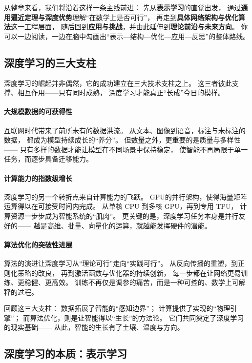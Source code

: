 从整章来看，我们将沿着这样一条主线前进：  
先从\textbf{表示学习}的直觉出发，  
通过\textbf{通用逼近定理与深度优势}理解“在数学上是否可行”，  
再走到\textbf{具体网络架构与优化算法}这一工程层面，  
随后回到\textbf{应用与挑战}，并由此延伸到\textbf{理论前沿与未来方向}。  
你可以一边阅读，一边在脑中勾画出“表示—结构—优化—应用—反思”的整体路线。

\subsection{深度学习的三大支柱}

深度学习的崛起并非偶然，它的成功建立在三大技术支柱之上。  
这三者彼此支撑、相互作用——只有同时成熟，  
深度学习才能真正“长成”今日的模样。

\paragraph{大规模数据的可获得性}  
互联网时代带来了前所未有的数据洪流。  
从文本、图像到语音，标注与未标注的数据，  
都成为模型持续成长的“养分”。  
但数量之外，更重要的是质量与多样性——  
只有多样的数据才能让模型在不同场景中保持稳定，  
使智能不再局限于单一任务，而逐步具备迁移能力。  

\paragraph{计算能力的指数级增长}  
深度学习的另一个转折点来自计算能力的飞跃。  
GPU的并行架构，使得海量矩阵运算得以在可接受时间内完成。  
从单核 CPU 到多核 GPU，再到专用 TPU，  
计算资源一步步成为智能系统的“肌肉”。  
更关键的是，深度学习任务本身是并行友好的——  
越是高维、批量、向量化的运算，就越能发挥硬件的潜能。  

\paragraph{算法优化的突破性进展}  
算法的演进让深度学习从“理论可行”走向“实践可行”。  
从反向传播的重塑，到正则化策略的改良，  
再到激活函数与优化器的持续创新，  
每一步都在让网络更易训练、更稳健、更高效。  
训练不再仅是调参的痛苦，而是一种可控的、数学上可解释的过程。  

回顾这三大支柱：  
数据拓展了智能的“感知边界”；  
计算提供了实现的“物理引擎”；  
而算法优化，则是让智能得以“生长”的方法论。  
它们共同奠定了深度学习的现实基础——  
从此，智能的生长有了土壤、温度与方向。

\subsection{深度学习的本质：表示学习}

